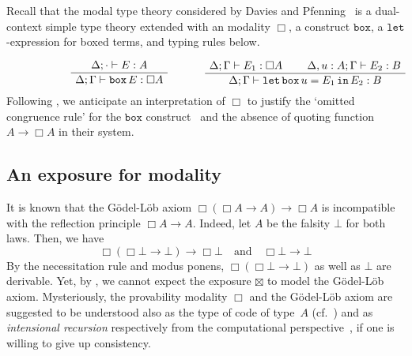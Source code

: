 \documentclass[a4paper,UKenglish,numberwithinsect,cleveref,thm-restate]{lipics-v2021}
\numberwithin{equation}{section}
\theoremstyle{plain}
\begin{document}
\begin{remark}\label{remark:S4-modality}
  Recall that the modal type theory considered by Davies and Pfenning~\cite{Davies2001b} is a dual-context simple type theory extended with an \SFour modality $\Box$, a construct $\mathtt{box}$, a $\mathtt{let}$-expression for boxed terms, and typing rules below.
\[
\begin{minipage}{.47\linewidth}
  \begin{prooftree}
    \AxiomC{$\Delta; \cdot \vdash E : A$}
    \UnaryInfC{$\Delta; \Gamma \vdash \mathtt{box}\,E:\Box A$}
  \end{prooftree}
\end{minipage}%
\begin{minipage}{0.47\linewidth}
  \begin{prooftree}
    \AxiomC{$\Delta; \Gamma \vdash E_1 : \Box A$}
    \AxiomC{$\Delta, u : A; \Gamma \vdash E_2 : B$}
  \BinaryInfC{$\Delta; \Gamma \vdash \mathtt{let}\,\mathtt{box}\, u = E_1\, \mathtt{in}\,E_2 : B$}
  \end{prooftree}
\end{minipage}
\]
Following , we anticipate an interpretation of $\Box$ to justify the `omitted congruence rule' for the $\mathtt{box}$ construct~\cite[Section~2.5]{Davies2001b} and the absence of quoting function $A \to \Box A$ in their system.
\end{remark}

\subsection{An exposure for \texorpdfstring{\GL}{GL} modality}
It is known that the Gödel-Löb axiom $\Box(\Box A \to A) \to \Box A$ is incompatible with the reflection principle $\Box A \to A$.
Indeed, let $A$ be the falsity $\bot$ for both laws. Then, we have
\[
  \Box(\Box \bot \to \bot) \to \Box \bot
  \quad\text{and}\quad
  \Box \bot \to \bot
\]
By the necessitation rule and modus ponens, $\Box (\Box \bot \to \bot)$ as well as $\bot$ are derivable.
Yet, by , we cannot expect the exposure $\boxtimes$ to model the Gödel-Löb axiom.
Mysteriously, the provability modality $\Box$ and the Gödel-Löb axiom are suggested to be understood also as the type of code of type~$A$ (cf.~) and as \emph{intensional recursion} respectively from the computational perspective~\cite{Kavvos2017b}, if one is willing to give up consistency.
\end{document}
